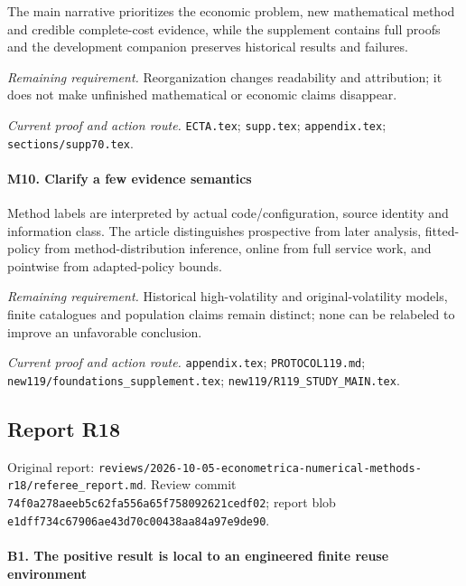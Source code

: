 The main narrative prioritizes the economic problem, new mathematical method and credible complete-cost evidence, while the supplement contains full proofs and the development companion preserves historical results and failures.

\par\emph{Remaining requirement.} Reorganization changes readability and attribution; it does not make unfinished mathematical or economic claims disappear.

\par\emph{Current proof and action route.} \nolinkurl{ECTA.tex}; \nolinkurl{supp.tex}; \nolinkurl{appendix.tex}; \nolinkurl{sections/supp70.tex}.

\paragraph{M10. Clarify a few evidence semantics}

Method labels are interpreted by actual code/\allowbreak{}configuration, source identity and information class. The article distinguishes prospective from later analysis, fitted-policy from method-distribution inference, online from full service work, and pointwise from adapted-policy bounds.

\par\emph{Remaining requirement.} Historical high-volatility and original-volatility models, finite catalogues and population claims remain distinct; none can be relabeled to improve an unfavorable conclusion.

\par\emph{Current proof and action route.} \nolinkurl{appendix.tex}; \nolinkurl{PROTOCOL119.md}; \nolinkurl{new119/foundations_supplement.tex}; \nolinkurl{new119/R119_STUDY_MAIN.tex}.

\subsection{Report R18}

Original report: \nolinkurl{reviews/2026-10-05-econometrica-numerical-methods-r18/referee_report.md}. Review commit \nolinkurl{74f0a278aeeb5c62fa556a65f758092621cedf02}; report blob \nolinkurl{e1dff734c67906ae43d70c00438aa84a97e9de90}.

\paragraph{B1. The positive result is local to an engineered finite reuse environment}

